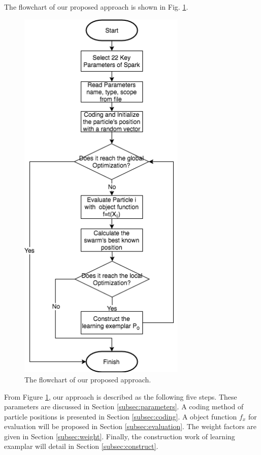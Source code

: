 \par The flowchart of our proposed approach is shown in Fig. \ref{fig:flowchart}.
\begin{figure}\center
	\includegraphics[width=8cm]{flowchart.png}
	\caption{The flowchart of our proposed approach.}\label{fig:flowchart}
\end{figure}
\par From Figure \ref{fig:flowchart}, our approach is described as the following five steps. These parameters are discussed in Section \ref{subsec:parameters}. A coding method of particle positions is presented in Section \ref{subsec:coding}. A object function $f_x$ for evaluation will be proposed in Section \ref{subsec:evaluation}. The weight factors are given in Section \ref{subsec:weight}. Finally, the construction work of learning examplar will detail in Section \ref{subsec:construct}.
